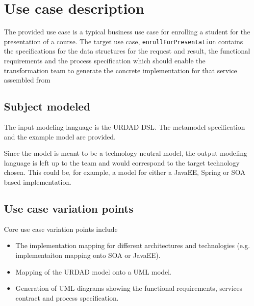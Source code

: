 \section{Use case description}

The provided use case is a typical business use case for enrolling a student for the presentation of a course. The target use case,
\verb+enrollForPresentation+ contains the specifications for the data structures for the request and result, the functional requirements
and the process specification which should enable the transformation team to generate the concrete implementation for that service
assembled from

\subsection{Subject modeled}

The input modeling language is the URDAD DSL. The metamodel specification and the example model are provided.

Since the model is meant to be a technology neutral model, the output modeling language is left up to the team and would correspond to the target technology chosen. This could be, for example, a model for either a JavaEE, Spring or SOA based implementation.

\subsection{Use case variation points}
Core use case variation points include
\begin{itemize}
  \item The implementation mapping for different architectures and technologies (e.g. implementaiton mapping onto SOA or JavaEE).
  \item Mapping of the URDAD model onto a UML model.
  \item Generation of UML diagrams showing the functional requirements, services contract and process specification.
\end{itemize}
